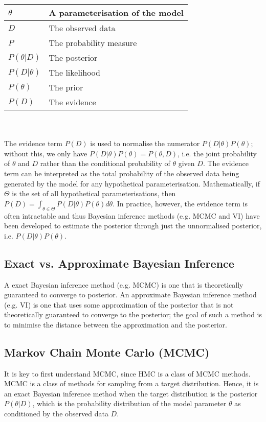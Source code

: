 \documentclass[conference]{IEEEtran}
\begin{document}
\begin{tabular}{| m{1.5cm} | m{6cm} |}
    \hline
    $\theta$ & A parameterisation of the model \\
    \hline
    $D$ & The observed data \\
    \hline
    $P$ & The probability measure \\
    \hline
    $P(\theta|D)$ & The posterior \\
    \hline
    $P(D|\theta)$ & The likelihood \\
    \hline
    $P(\theta)$ & The prior \\
    \hline
    $P(D)$ & The evidence \\
    \hline
\end{tabular} \\~\\

The evidence term $P(D)$ is used to normalise the numerator $P(D|\theta)P(\theta)$; without this, we only have $P(D|\theta)P(\theta) = P(\theta, D)$, i.e. the joint probability of $\theta$ and $D$ rather than the conditional probability of $\theta$ given $D$. The evidence term can be interpreted as the total probability of the observed data being generated by the model for any hypothetical parameterisation. Mathematically, if $\Theta$ is the set of all hypothetical parameterisations, then $P(D) = \int_{\theta \in \Theta} P(D|\theta)P(\theta) d\theta$. In practice, however, the evidence term is often intractable and thus Bayesian inference methods (e.g. MCMC and VI) have been developed to estimate the posterior through just the unnormalised posterior, i.e. $P(D|\theta)P(\theta)$.

\subsection{Exact vs. Approximate Bayesian Inference}
A exact Bayesian inference method (e.g. MCMC) is one that is theoretically guaranteed to converge to posterior. An approximate Bayesian inference method (e.g. VI) is one that uses some approximation of the posterior that is not theoretically guaranteed to converge to the posterior; the goal of such a method is to minimise the distance between the approximation and the posterior.

\subsection{Markov Chain Monte Carlo (MCMC)}
It is key to first understand MCMC, since HMC is a class of MCMC methods. MCMC is a class of methods for sampling from a target distribution. Hence, it is an exact Bayesian inference method when the target distribution is the posterior $P(\theta|D)$, which is the probability distribution of the model parameter $\theta$ as conditioned by the observed data $D$.\\
\end{document}
